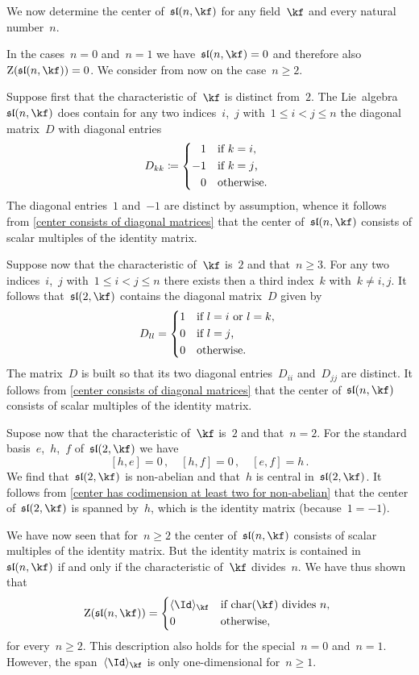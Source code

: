 \begin{example}
	We now determine the center of~$\sllie(n, \kf)$ for any field~$\kf$ and every natural number~$n$.

	In the cases~$n = 0$ and~$n = 1$ we have~$\sllie(n, \kf) = 0$ and therefore also~$\centerlie( \sllie(n, \kf) ) = 0$.
	We consider from now on the case~$n \geq 2$.

	Suppose first that the characteristic of~$\kf$ is distinct from~$2$.
	The Lie~algebra~$\sllie(n, \kf)$ does contain for any two indices~$i$,~$j$ with~$1 \leq i < j \leq n$ the diagonal matrix~$D$ with diagonal entries
	\[
		D_{kk}
		\defined
		\begin{cases*}
			\phantom{-}1  & if~$k = i$, \\
								-1  & if~$k = j$, \\
			\phantom{-}0  & otherwise.
		\end{cases*}
	\]
	The diagonal entries~$1$ and~$-1$ are distinct by assumption, whence it follows from \cref{center consists of diagonal matrices} that the center of~$\sllie(n, \kf)$ consists of scalar multiples of the identity matrix.

	Suppose now that the characteristic of~$\kf$ is~$2$ and that~$n \geq 3$.
	For any two indices~$i$,~$j$ with~$1 \leq i < j \leq n$ there exists then a third index~$k$ with~$k \neq i, j$.
	It follows that~$\sllie(2, \kf)$ contains the diagonal matrix~$D$ given by
	\[
		D_{ll}
		=
		\begin{cases*}
			1 & if~$l = i$ or~$l = k$, \\
			0 & if~$l = j$,  \\
			0 & otherwise.
		\end{cases*}
	\]
	The matrix~$D$ is built so that its two diagonal entries~$D_{ii}$ and~$D_{jj}$ are distinct.
	It follows from \cref{center consists of diagonal matrices} that the center of~$\sllie(n, \kf)$ consists of scalar multiples of the identity matrix.

	Supose now that the characteristic of~$\kf$ is~$2$ and that~$n = 2$.
	For the standard basis~$e$,~$h$,~$f$ of~$\sllie(2, \kf)$ we have
	\[
		[h, e] = 0 \,,
		\quad
		[h, f] = 0 \,,
		\quad
		[e, f] = h \,.
	\]
	We find that~$\sllie(2, \kf)$ is non-abelian and that~$h$ is central in~$\sllie(2, \kf)$.
	It follows from \cref{center has codimension at least two for non-abelian} that the center of~$\sllie(2, \kf)$ is spanned by~$h$, which is the identity matrix (because~$1 = -1$).

	We have now seen that for~$n \geq 2$ the center of~$\sllie(n, \kf)$ consists of scalar multiples of the identity matrix.
	But the identity matrix is contained in~$\sllie(n, \kf)$ if and only if the characteristic of~$\kf$ divides~$n$.
	We have thus shown that
	\[
		\centerlie( \sllie(n, \kf) )
		=
		\begin{cases*}
			\gen{ \Id }_{\kf} & if~$\ringchar(\kf)$ divides~$n$, \\
			0                 & otherwise,
		\end{cases*}
	\]
	for every~$n \geq 2$.
	This description also holds for the special~$n = 0$ and~$n = 1$.
	However, the span~$\gen{ \Id }_{\kf}$ is only one-dimensional for~$n \geq 1$.
\end{example}


